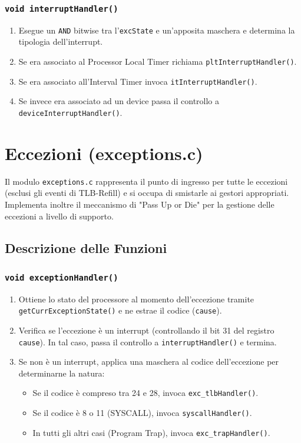 \documentclass[a4paper,12pt]{article}
\begin{document}
\subsubsection{\texttt{void interruptHandler()}}
\begin{enumerate}
    \item Esegue un \texttt{AND} bitwise tra l'\texttt{excState} e un'apposita maschera e determina la tipologia dell'interrupt.
    \item  Se era associato al Processor Local Timer richiama \texttt{pltInterruptHandler()}.
    \item Se era associato all'Interval Timer invoca \texttt{itInterruptHandler()}.
    \item Se invece era associato ad un device passa il controllo a \texttt{deviceInterruptHandler()}.
\end{enumerate}

\section{Eccezioni (exceptions.c)}
Il modulo \texttt{exceptions.c} rappresenta il punto di ingresso per tutte le eccezioni (esclusi gli eventi di TLB-Refill) e si occupa di smistarle ai gestori appropriati. Implementa inoltre il meccanismo di "Pass Up or Die" per la gestione delle eccezioni a livello di supporto.

\vspace{0.5cm}
\subsection{Descrizione delle Funzioni}

\subsubsection{\texttt{void exceptionHandler()}}
\begin{enumerate}
    \item Ottiene lo stato del processore al momento dell'eccezione tramite \texttt{getCurrExceptionState()} e ne estrae il codice (\texttt{cause}).
    \item Verifica se l'eccezione è un interrupt (controllando il bit 31 del registro \texttt{cause}). In tal caso, passa il controllo a \texttt{interruptHandler()} e termina.
    \item Se non è un interrupt, applica una maschera al codice dell'eccezione per determinarne la natura:
    \begin{itemize}
        \item Se il codice è compreso tra 24 e 28, invoca \texttt{exc\_tlbHandler()}.
        \item Se il codice è 8 o 11 (SYSCALL), invoca \texttt{syscallHandler()}.
        \item In tutti gli altri casi (Program Trap), invoca \texttt{exc\_trapHandler()}.
    \end{itemize}
\end{enumerate}
\end{document}
